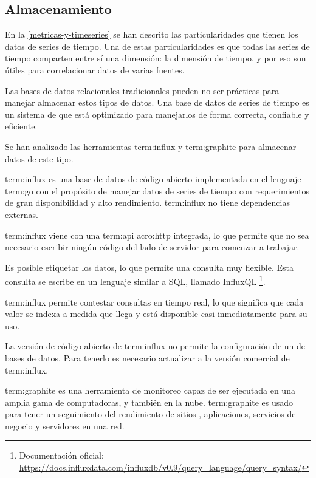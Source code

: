\subsection{Almacenamiento}
\label{almacenamiento}

En la \autoref{metricas-y-timeseries} se han descrito las particularidades que
tienen los datos de series de tiempo. Una de estas particularidades es que
todas las series de tiempo comparten entre sí una dimensión: la dimensión de
tiempo, y por eso son útiles para correlacionar datos de varias fuentes.

Las bases de datos relacionales tradicionales pueden no ser prácticas para
manejar almacenar estos tipos de datos. Una base de datos de series de tiempo
es un sistema de  que está optimizado para manejarlos de forma
correcta, confiable y eficiente.

Se han analizado las herramientas \gls{term:influx} y \gls{term:graphite} para
almacenar datos de este tipo.

\gls{term:influx} es una base de datos de código abierto implementada en el
lenguaje \gls{term:go} con el propósito de manejar datos de series de tiempo
con requerimientos de gran disponibilidad y alto rendimiento. \gls{term:influx}
no tiene dependencias externas.

\gls{term:influx} viene con una \gls{term:api} \gls{acro:http} integrada, lo
que permite que no sea necesario escribir ningún código del lado de servidor
para comenzar a trabajar. \cite{influxdb}

Es posible etiquetar los datos, lo que permite una consulta muy flexible. Esta
consulta se escribe en un lenguaje similar a SQL, llamado InfluxQL
\footnote{Documentación oficial:
\url{https://docs.influxdata.com/influxdb/v0.9/query_language/query_syntax/}}.

\gls{term:influx} permite contestar consultas en tiempo real, lo que significa
que cada valor se indexa a medida que llega y está disponible casi
inmediatamente para su uso.

La versión de código abierto de \gls{term:influx} no permite la configuración de
un  de bases de datos. Para tenerlo es necesario actualizar a la
versión comercial de \gls{term:influx}.

\gls{term:graphite} es una herramienta de monitoreo capaz de ser ejecutada en
una amplia gama de computadoras, y también en la nube. \gls{term:graphite} es
usado para tener un seguimiento del rendimiento de sitios ,
aplicaciones, servicios de negocio y servidores en una red.

